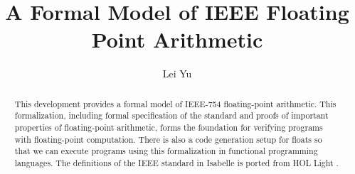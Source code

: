 \documentclass[11pt,a4paper]{article}
\begin{document}
\title{A Formal Model of IEEE Floating Point Arithmetic}
\author{Lei Yu}
\maketitle

\begin{abstract}
  This development provides a formal model of IEEE-754 floating-point arithmetic. This formalization, 
including formal specification of the standard and proofs of important properties of floating-point arithmetic, forms the foundation for verifying programs with floating-point computation. There is 
also a code generation setup for floats so that we can execute programs using this formalization in functional programming languages. The definitions of the IEEE standard in Isabelle is ported from HOL Light \cite{harrison1997floating}.
\end{abstract}

\tableofcontents





\end{document}
